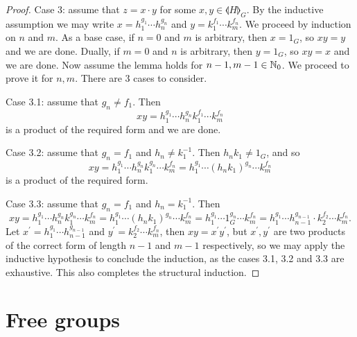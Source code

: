 \begin{proof}
  Case 3: assume that $z = x\cdot y$ for some $x, y\in \llangle H \rrangle_G$. By the inductive
  assumption we may write
  $x = h_1^{g_1} \cdots h_n^{g_n}$
  and $y = k_1^{f_1} \cdots k_m^{f_n}$. We proceed by induction on $n$ and $m$.
  As a base case, if $n = 0$ and $m$ is arbitrary, then $x = 1_G$, so $xy = y$ and we are done.
  Dually, if $m = 0$ and $n$ is arbitrary, then $y = 1_G$, so $xy = x$ and we are done. Now
  assume the lemma holds for $n-1, m-1\in \mathbb{N}_0$. We proceed to prove it for
  $n, m$. There are 3 cases to consider.

  Case 3.1: assume that $g_n \neq f_1$. Then
  \[ xy = h_1^{g_1} \cdots h_n^{g_n}k_1^{f_1} \cdots k_m^{f_n}\]
  is a product of the required form and we are done.

  Case 3.2: assume that $g_n = f_1$ and $h_n \neq k_1^{-1}$. Then $h_n k_1 \neq 1_G$, and so
  \[
    xy = h_1^{g_1} \cdots h_n^{g_n}k_1^{g_n} \cdots k_m^{f_n} =
    h_1^{g_1} \cdots {\left(h_n k_1 \right)}^{g_n} \cdots k_m^{f_n}
  \]
  is a product of the required form.

  Case 3.3: assume that $g_n = f_1$ and $h_n = k_1^{-1}$. Then
  \[
    xy = h_1^{g_1} \cdots h_n^{g_n}k_1^{g_n} \cdots k_m^{f_n} =
    h_1^{g_1} \cdots {\left(h_n k_1\right)}^{g_n} \cdots k_m^{f_n} =
    h_1^{g_1} \cdots 1_G^{g_n} \cdots k_m^{f_n} =
    h_1^{g_1} \cdots h_{n-1}^{g_{n-1}} \cdot k_2^{f_{2}} \cdots k_m^{f_n}.
  \]
  Let $x^\prime = h_1^{g_1} \cdots h_{n-1}^{g_{n-1}}$ and
  $y^\prime = k_2^{f_{2}} \cdots k_m^{f_n}$, then $x y = x^\prime y^\prime$, but
  $x^\prime, y^\prime$ are two products of the
  correct form of length $n-1$ and $m-1$ respectively, so we may apply the inductive hypothesis
  to conclude the induction, as the cases 3.1, 3.2 and 3.3 are exhaustive. This also completes
  the structural induction.
\end{proof}


\section{Free groups}


